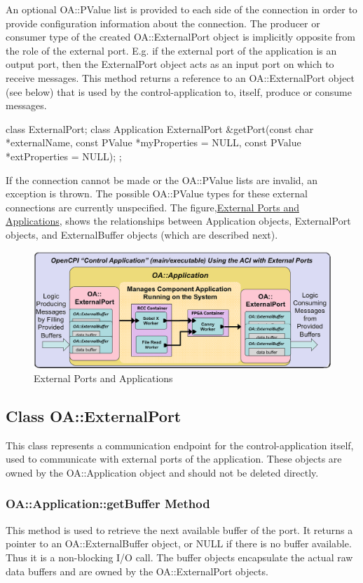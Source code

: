 \documentclass[10pt, a4paper, oneside]{article}
\renewcommand\_{\textunderscore\allowbreak} %
\begin{document}
An optional OA::PValue list is provided to each side of the connection in order to provide configuration information about the connection.  The producer or consumer type of the created OA::ExternalPort object is implicitly opposite from the role of the external port. E.g. if the external port of the application is an output port, then the ExternalPort object acts as an input port on which to receive messages.  This method returns a reference to an OA::ExternalPort object (see below) that is used by the control-application to, itself, produce or consume messages.
\begin{ocpixml}
class ExternalPort;
class Application {
  ExternalPort &getPort(const char *externalName,
                        const PValue *myProperties = NULL,
                        const PValue *extProperties = NULL);
};
\end{ocpixml} 
If the connection cannot be made or the OA::PValue lists are invalid, an exception is thrown.  The possible OA::PValue types for these external connections are currently unspecified. The figure,\hyperlink{fig:Relationships}{External Ports and Applications}, shows the relationships between Application objects, ExternalPort objects, and ExternalBuffer objects (which are described next).\\
\begin{figure}[h!]
	\centering
 	\includegraphics[width=\textwidth]{Relationships}
	\caption{External Ports and Applications}\hypertarget{fig:Relationships}{}
	\end{figure}
\subsection{Class OA::ExternalPort} This class represents a communication endpoint for the control-application itself, used to communicate with external ports of the application.  These objects are owned by the {OA::Application} object and should not be deleted directly.
\subsubsection{OA::Application::getBuffer Method}This method is used to retrieve the next available buffer of the port.  It returns a pointer to an OA::ExternalBuffer object, or NULL if there is no buffer available.  Thus it is a non-blocking I/O call.  The buffer objects encapsulate the actual raw data buffers and are owned by the OA::ExternalPort objects. \\
\end{document}
